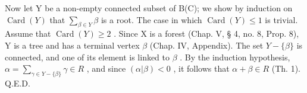 Now let Y be a non-empty connected subset of B(C); we show by induction on \(\operatorname{Card}(Y)\) that \(\sum_{\beta\in Y}\beta\) is a root. The case in which \(\operatorname{Card}(Y)\leqslant1\) is trivial. Assume that \(\operatorname{Card}(Y)\geqslant2\) . Since X is a forest (Chap. V, § 4, no. 8, Prop. 8), Y is a tree and has a terminal vertex \(\beta\) (Chap. IV, Appendix). The set \(Y-\{\beta\}\) is connected, and one of its element is linked to \(\beta\) . By the induction hypothesis, \(\alpha=\sum_{\gamma\in Y-\{\beta\}}\gamma\in R\) , and since \((\alpha|\beta)<0\) , it follows that \(\alpha+\beta\in R\) (Th. 1). Q.E.D.

